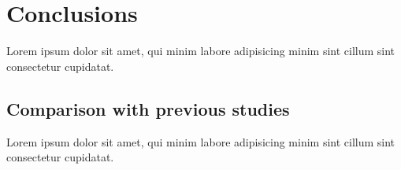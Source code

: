\chapter{Conclusions}
\label{chap:conclusion}

Lorem ipsum dolor sit amet, qui minim labore adipisicing minim sint cillum sint consectetur cupidatat.

\section{Comparison with previous studies}

Lorem ipsum dolor sit amet, qui minim labore adipisicing minim sint cillum sint consectetur cupidatat.
